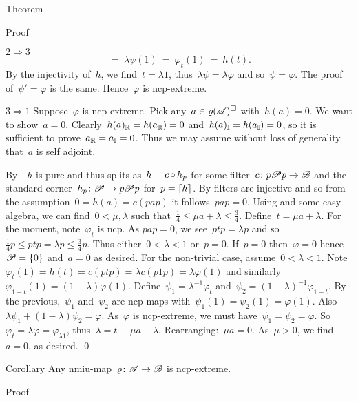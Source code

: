 \documentclass[b]{subfiles}
\begin{document}
\begin{parsec}
\begin{point}{Theorem}
\begin{point}{Proof}
\begin{point}{$2 \Rightarrow 3$}
\begin{equation*}
    \ =\  \lambda \psi(1)
    \ =\  \varphi_t (1)  \ =\  h(t).
\end{equation*}
By the injectivity of~$h$,
    we find~$t = \lambda 1$,
    thus~$\lambda \psi = \lambda \varphi$
    and so~$\psi = \varphi$.
The proof of~$\psi' = \varphi$ is the same.
Hence~$\varphi$ is ncp-extreme.
\end{point}
\begin{point}{$3 \Rightarrow 1$}%
Suppose~$\varphi$ is ncp-extreme.
Pick any~$a \in \varrho(\mathscr{A})^\square$ with~$h(a) = 0$.
We want to show~$a = 0$.
Clearly~$h(a)_{\mathbb{R}} = h(a_{\mathbb{R}}) = 0$
and~$h(a)_{\mathbb{I}} = h(a_{\mathbb{I}}) = 0$,
so it is sufficient to prove~$a_{\mathbb{R}} = a_{\mathbb{I}}=0$.
Thus we may assume without loss of generality that~$a$ is self adjoint.

By~~$h$ is pure
    and thus splits as~$h = c \mathop{\circ} h_p$
    for some filter~$c \colon p\mathscr{P} p \to \mathscr{B}$
    and the standard corner~$h_p\colon \mathscr{P} \to p\mathscr{P} p$
    for~$p = \left\lceil h\right\rceil$.
By  filters are injective
    and so from the assumption~$0 = h(a) = c(pap)$
    it follows~$pap = 0$.
Using  and some easy algebra,
    we can find~$0 < \mu,\lambda$
    such that~$\frac{1}{4} \leq \mu a + \lambda \leq \frac{3}{4}$.
Define~$t = \mu a + \lambda$.
For the moment, note~$\varphi_t$ is ncp.
As $pap = 0$, we see~$ptp = \lambda p$ and
so~$\frac{1}{4} p \leq  ptp = \lambda p
    \leq \frac{3}{4} p$.
Thus either~$0 < \lambda < 1$ or~$p = 0$.
If~$p = 0$ then~$\varphi=0$ hence~$\mathscr{P} = \{0\}$
    and~$a = 0$ as desired.
For the non-trivial case, assume~$0 < \lambda <1$.
Note~$\varphi_t(1) = h(t) = c(ptp) = \lambda c(p1p) = \lambda \varphi(1)$
    and similarly~$\varphi_{1-t}(1) = (1-\lambda) \varphi(1)$.
Define~$\psi_1 = \lambda^{-1} \varphi_t$
and~$\psi_2 = (1-\lambda)^{-1}\varphi_{1-t}$.
By the previous,~$\psi_1$ and~$\psi_2$ are ncp-maps
    with~$\psi_1(1)=\psi_2(1)=\varphi(1)$.
    Also~$\lambda \psi_1 + (1-\lambda) \psi_2 = \varphi$.
As~$\varphi$ is ncp-extreme,
    we must have~$\psi_1 = \psi_2 = \varphi$.
So~$\varphi_t = \lambda \varphi = \varphi_{\lambda 1}$,
    thus~$\lambda = t \equiv \mu a + \lambda$.
    Rearranging:~$\mu a = 0$.
    As~$\mu > 0$, we find~$a=0$, as desired. \qed
\end{point}
\end{point}
\end{point}
\begin{point}{Corollary}%
Any nmiu-map~$\varrho\colon \mathscr{A} \to \mathscr{B}$ is ncp-extreme. 
\begin{point}{Proof}%

\end{point}
\end{point}
\end{parsec}
\end{document}

